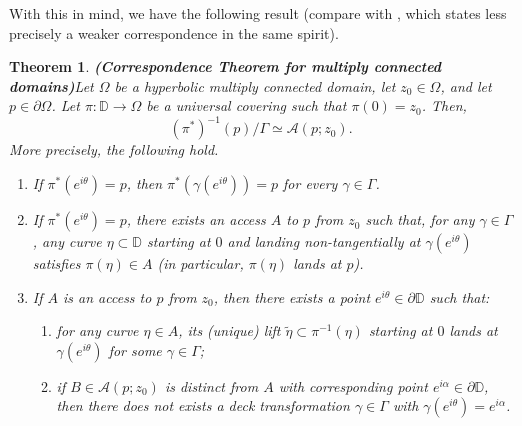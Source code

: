 \documentclass[11pt,a4paper,reqno]{amsart}
\theoremstyle{plain}
\newtheorem{thm}{Theorem}[section]
\theoremstyle{definition}
\theoremstyle{plain}
\def\DD{\mathbb{D}}
\renewcommand{\tilde}{\widetilde}
\begin{document}
With this in mind, we have the following result (compare with \cite[Thm. 4]{Oht54}, which states less precisely a weaker correspondence in the same spirit).
\begin{thm}{\bf(Correspondence Theorem for multiply connected domains)}\label{thm:correspondence-mc}
Let $\Omega$ be a hyperbolic multiply connected domain, let $z_0\in\Omega$, and let $p\in\partial\Omega$. Let $\pi\colon\DD\to\Omega$ be a universal covering such that $\pi(0) = z_0$. Then,
\[ (\pi^*)^{-1}(p)/\Gamma \simeq \mathcal{A}(p; z_0). \]
More precisely, the following hold.
\begin{enumerate}[label={\normalfont (\alph*)}]
	\item If $\pi^*(e^{i\theta}) = p$, then $\pi^*(\gamma(e^{i\theta})) = p$ for every $\gamma\in\Gamma$.
		\item If $\pi^*(e^{i\theta}) = p$, there exists an access $A$ to $p$ from $z_0$ such that, for any $\gamma\in\Gamma$, any curve $\eta\subset\DD$ starting at $0$ and landing non-tangentially at $\gamma(e^{i\theta})$ satisfies $\pi(\eta)\in A$ (in particular, $\pi(\eta)$ lands at $p$).
	\item If $A$ is an access to $p$ from $z_0$, then there exists a point $e^{i\theta}\in\partial\DD$ such that:
	\begin{enumerate}[label={\normalfont (\roman*)}]
		\item for any curve $\eta\in A$, its (unique) lift $\tilde\eta\subset\pi^{-1}(\eta)$ starting at $0$ lands at $\gamma(e^{i\theta})$ for some $\gamma\in\Gamma$;
		\item if $B\in\mathcal{A}(p; z_0)$ is distinct from $A$ with corresponding point $e^{i\alpha}\in\partial\DD$, then there does not exists a deck transformation $ \gamma\in \Gamma $ with $ \gamma(e^{i\theta})=e^{i\alpha} $.
	\end{enumerate}
\end{enumerate}
\end{thm}
\end{document}
